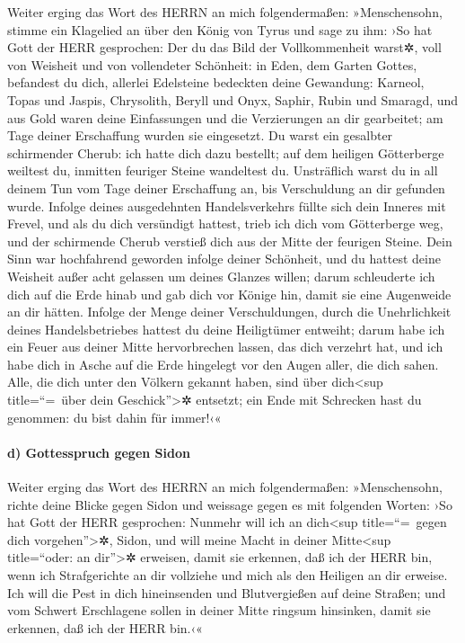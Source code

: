 Weiter erging das Wort des HERRN an mich folgendermaßen:
»Menschensohn, stimme ein Klagelied an über den König von
Tyrus und sage zu ihm: ›So hat Gott der HERR gesprochen: Der du das Bild
der Vollkommenheit warst✲, voll von Weisheit und von vollendeter
Schönheit: in Eden, dem Garten Gottes, befandest du dich,
allerlei Edelsteine bedeckten deine Gewandung: Karneol, Topas und
Jaspis, Chrysolith, Beryll und Onyx, Saphir, Rubin und Smaragd, und aus
Gold waren deine Einfassungen und die Verzierungen an dir gearbeitet; am
Tage deiner Erschaffung wurden sie eingesetzt. Du warst
ein gesalbter schirmender Cherub: ich hatte dich dazu bestellt; auf dem
heiligen Götterberge weiltest du, inmitten feuriger Steine wandeltest
du. Unsträflich warst du in all deinem Tun vom Tage
deiner Erschaffung an, bis Verschuldung an dir gefunden wurde.
Infolge deines ausgedehnten Handelsverkehrs füllte sich
dein Inneres mit Frevel, und als du dich versündigt hattest, trieb ich
dich vom Götterberge weg, und der schirmende Cherub verstieß dich aus
der Mitte der feurigen Steine. Dein Sinn war hochfahrend
geworden infolge deiner Schönheit, und du hattest deine Weisheit außer
acht gelassen um deines Glanzes willen; darum schleuderte ich dich auf
die Erde hinab und gab dich vor Könige hin, damit sie eine Augenweide an
dir hätten. Infolge der Menge deiner Verschuldungen,
durch die Unehrlichkeit deines Handelsbetriebes hattest du deine
Heiligtümer entweiht; darum habe ich ein Feuer aus deiner Mitte
hervorbrechen lassen, das dich verzehrt hat, und ich habe dich in Asche
auf die Erde hingelegt vor den Augen aller, die dich sahen.
Alle, die dich unter den Völkern gekannt haben, sind über
dich\textless sup title=``=~über dein Geschick''\textgreater✲ entsetzt;
ein Ende mit Schrecken hast du genommen: du bist dahin für immer!‹«

\hypertarget{d-gottesspruch-gegen-sidon}{%
\paragraph{d) Gottesspruch gegen
Sidon}\label{d-gottesspruch-gegen-sidon}}

Weiter erging das Wort des HERRN an mich folgendermaßen:
»Menschensohn, richte deine Blicke gegen Sidon und
weissage gegen es mit folgenden Worten: ›So hat Gott der
HERR gesprochen: Nunmehr will ich an dich\textless sup title=``=~gegen
dich vorgehen''\textgreater✲, Sidon, und will meine Macht in deiner
Mitte\textless sup title=``oder: an dir''\textgreater✲ erweisen, damit
sie erkennen, daß ich der HERR bin, wenn ich Strafgerichte an dir
vollziehe und mich als den Heiligen an dir erweise. Ich
will die Pest in dich hineinsenden und Blutvergießen auf deine Straßen;
und vom Schwert Erschlagene sollen in deiner Mitte ringsum hinsinken,
damit sie erkennen, daß ich der HERR bin.‹«

